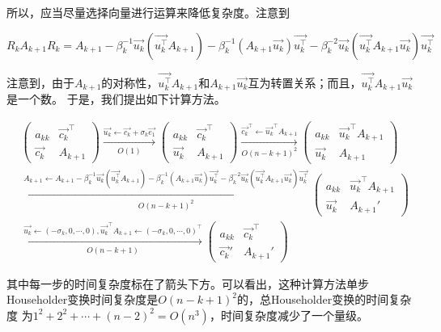 \documentclass[10pt, a4paper]{article}
\begin{document}
    所以，应当尽量选择向量进行运算来降低复杂度。注意到

    \[
        R_kA_{k+1}R_k=A_{k+1}-\beta_k^{-1}\vec{u_k}(\vec{u_k^\top}A_{k+1})-\beta_k^{-1}(A_{k+1}\vec{u_k})\vec{u_k^\top}-
        \beta_k^{-2}\vec{u_k}(\vec{u_k^\top}A_{k+1}\vec{u_k})\vec{u_k^\top}
    \]

    注意到，由于$A_{k+1}$的对称性，$\vec{u_k^\top}A_{k+1}$和$A_{k+1}\vec{u_k}$互为转置关系；而且，$\vec{u_k^\top}A_{k+1}\vec{u_k}$是一个数。
    于是，我们提出如下计算方法。

    \begin{align*}
        &\begin{pmatrix}
            a_{kk}&\vec{c_k}^\top\\
            \vec{c_k}&A_{k+1}
        \end{pmatrix}
        \xrightarrow[O(1)]{\vec{u_k}\leftarrow\vec{c_k}+\sigma_k\vec{e_1}}
        \begin{pmatrix}
            a_{kk}&\vec{c_k}^\top\\
            \vec{u_k}&A_{k+1}
        \end{pmatrix}
        \xrightarrow[O(n-k+1)^2]{\vec{c_k}^\top\leftarrow\vec{u_k}^\top A_{k+1}}
        \begin{pmatrix}
            a_{kk}&\vec{u_k}^\top A_{k+1}\\
            \vec{u_k}&A_{k+1}
        \end{pmatrix}\\
        &\xrightarrow[O(n-k+1)^2]{A_{k+1}\leftarrow A_{k+1}-\beta_k^{-1}\vec{u_k}(\vec{u_k^\top}A_{k+1})-\beta_k^{-1}(A_{k+1}\vec{u_k})\vec{u_k^\top}-
        \beta_k^{-2}\vec{u_k}(\vec{u_k^\top}A_{k+1}\vec{u_k})\vec{u_k^\top}}
        \begin{pmatrix}
            a_{kk}&\vec{u_k}^\top A_{k+1}\\
            \vec{u_k}&A_{k+1}'
        \end{pmatrix}\\
        &\xrightarrow[O(n-k+1)]{\vec{u_k}\leftarrow(-\sigma_k,0,\cdots,0),\vec{u_k}^\top A_{k+1}\leftarrow(-\sigma_k,0,\cdots,0)^\top}
        \begin{pmatrix}
            a_{kk}&\vec{c_k}^\top \\
            \vec{c_k}'&A_{k+1}'
        \end{pmatrix}
    \end{align*}

    其中每一步的时间复杂度标在了箭头下方。可以看出，这种计算方法单步Householder变换时间复杂度是$O(n-k+1)^2$的，总Householder变换的时间复杂度
    为$1^2+2^2+\cdots+(n-2)^2=O(n^3)$，时间复杂度减少了一个量级。
\end{document}
